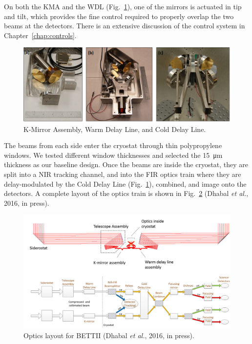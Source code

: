 On both the KMA and the WDL (Fig.~\ref{fig:SmallAssemblies}), one of the mirrors is actuated in tip and tilt, which provides the fine control required to properly overlap the two beams at the detectors. There is an extensive discussion of the control system in Chapter~\ref{chap:controls}.

\begin{figure}[!h]
		\centering
		\includegraphics[width=\textwidth]{Figures/Assemblies.png} 
		\caption[Small optical assemblies]{K-Mirror Assembly, Warm Delay Line, and Cold Delay Line.}
		\label{fig:SmallAssemblies}
\end{figure}

The beams from each side enter the cryostat through thin polypropylene windows. We tested different window thicknesses and selected the \SI{15}{\micro\meter} thickness as our baseline design. %
Once the beams are inside the cryostat, they are split into a NIR tracking channel, and into the FIR optics train where they are delay-modulated by the Cold Delay Line (Fig.~\ref{fig:SmallAssemblies}), combined, and image onto the detectors. A complete layout of the optics train is shown in Fig.~\ref{fig:OpticsLayout} (Dhabal \textit{et al.}, 2016, in press).


\begin{figure}[!h]
		\centering
		\includegraphics[width=\textwidth]{Figures/OpticsLayout.png} 
		\caption[Optics layout]{Optics layout for BETTII (Dhabal \textit{et al.}, 2016, in press).}
		\label{fig:OpticsLayout}
\end{figure}


